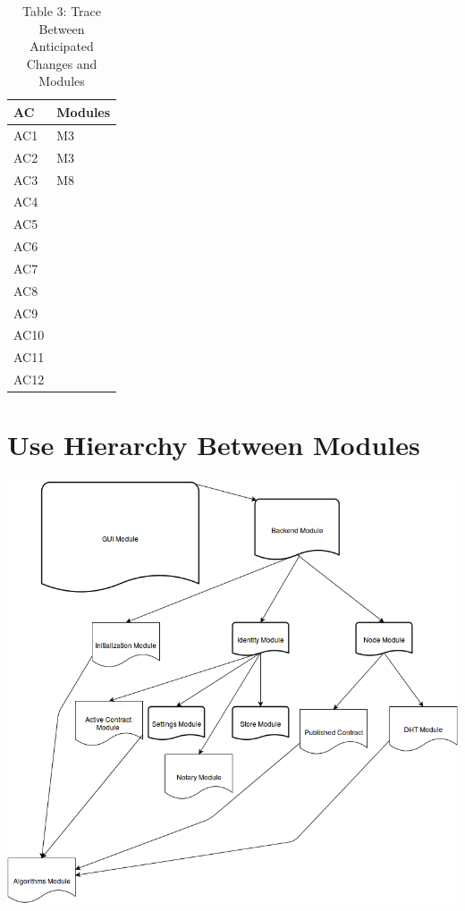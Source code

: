 \documentclass{article}
\begin{document}
\begin{table}[]
	\centering
	\begin{tabular}{p{} p{}}
		\toprule
		\textbf{AC} & \textbf{Modules}\\
		\midrule
		AC1 & M3\\ %
		AC2 & M3\\
		AC3 & M8\\
		AC4 & \\
		AC5 & \\
		AC6 & \\
		AC7 & \\
		AC8 & \\
		AC9 & \\
		AC10 & \\
		AC11 & \\
		AC12 & \\
		
		\bottomrule
	\end{tabular}
	\caption{Table 3: Trace Between Anticipated Changes and Modules}
	
\end{table}

\section*{Use Hierarchy Between Modules}
\includegraphics{use_hierarchy}
\end{document}

